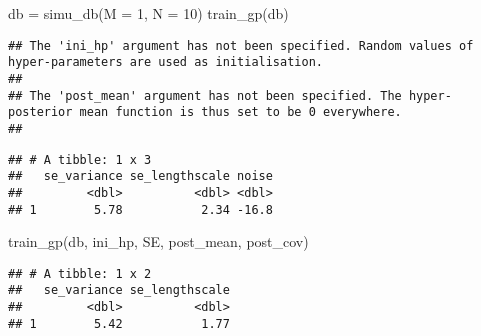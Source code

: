 \documentclass[
]{article}
\newenvironment{Shaded}{\begin{snugshade}}{\end{snugshade}}
\newcommand{\AttributeTok}[1]{\textcolor[rgb]{0.77,0.63,0.00}{#1}}
\newcommand{\DecValTok}[1]{\textcolor[rgb]{0.00,0.00,0.81}{#1}}
\newcommand{\FunctionTok}[1]{\textcolor[rgb]{0.00,0.00,0.00}{#1}}
\newcommand{\NormalTok}[1]{#1}
\newcommand{\OtherTok}[1]{\textcolor[rgb]{0.56,0.35,0.01}{#1}}
\newcommand{\SpecialCharTok}[1]{\textcolor[rgb]{0.00,0.00,0.00}{#1}}
\newcommand{\StringTok}[1]{\textcolor[rgb]{0.31,0.60,0.02}{#1}}
\begin{document}
\begin{Shaded}
\begin{Highlighting}[]
\NormalTok{db }\OtherTok{=} \FunctionTok{simu\_db}\NormalTok{(}\AttributeTok{M =} \DecValTok{1}\NormalTok{, }\AttributeTok{N =} \DecValTok{10}\NormalTok{)}
\FunctionTok{train\_gp}\NormalTok{(db)}
\end{Highlighting}
\end{Shaded}

\begin{verbatim}
## The 'ini_hp' argument has not been specified. Random values of hyper-parameters are used as initialisation.
##  
## The 'post_mean' argument has not been specified. The hyper-posterior mean function is thus set to be 0 everywhere.
## 
\end{verbatim}

\begin{verbatim}
## # A tibble: 1 x 3
##   se_variance se_lengthscale noise
##         <dbl>          <dbl> <dbl>
## 1        5.78           2.34 -16.8
\end{verbatim}

\begin{Shaded}
\end{Shaded}

\begin{Shaded}
\begin{Highlighting}[]
\FunctionTok{train\_gp}\NormalTok{(db, ini\_hp, }\StringTok{\textquotesingle{}SE\textquotesingle{}}\NormalTok{, post\_mean, post\_cov)}
\end{Highlighting}
\end{Shaded}

\begin{verbatim}
## # A tibble: 1 x 2
##   se_variance se_lengthscale
##         <dbl>          <dbl>
## 1        5.42           1.77
\end{verbatim}
\end{document}
